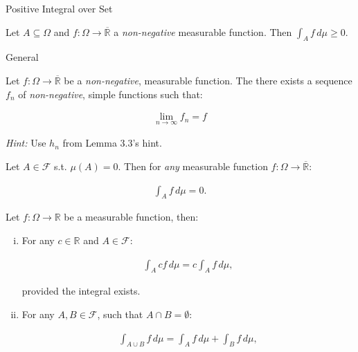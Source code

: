 \documentclass[10pt,landscape]{article}
\renewcommand{\geq}{\geqslant}
\newcommand{\Hint}{\textit{Hint: }}
\newcommand{\CalF}{\mathcal{F}}
\begin{document}
\begin{multicols}{3}
\begin{corollary}{}{Positive Integral over Set}

    Let $A \subseteq \Omega$ and $f: \Omega \to \overline{\mathbb{R}}$ a \emph{non-negative} measurable function. Then $\int_A f \, d\mu \geq 0$.

\end{corollary}

\begin{lemma}{3.3}{General}

    Let $f: \Omega \to \overline{\mathbb{R}}$ be a \emph{non-negative}, measurable function. The there exists a sequence $f_n$ of \emph{non-negative}, simple functions such that:

    \begin{align*}
        \lim_{n \to \infty} f_n = f
    \end{align*}

    \Hint Use $h_n$ from Lemma 3.3's hint.

\end{lemma}

\begin{exercise}{3.5}{}

    Let $A \in \CalF$ s.t. $\mu(A) = 0$. Then for \emph{any} measurable function $f: \Omega \to \overline{\mathbb{R}}$:
    
        \begin{align*}
            \int_A f \,d\mu = 0.
        \end{align*}

\end{exercise}

\begin{exercise}{3.6}{}

    Let $f: \Omega \to \mathbb{R}$ be a measurable function, then:

        \begin{enumerate}[(i)]
            \setlength{\parskip}{0em}
            \item For any $c \in \mathbb{R}$ and $A \in \CalF$:

                \begin{align*}
                    \int_A cf \, d\mu = c \int_A f \, d\mu,
                \end{align*}
            
            provided the integral exists.
            \item For any $A, B \in \CalF$, such that $A \cap B = \emptyset$:

                \begin{align*}
                    \int_{A \cup B} f \,d\mu = \int_{A} f \,d\mu + \int_{B} f \,d\mu,
                \end{align*}


\end{enumerate}
\end{exercise}
\end{multicols}
\end{document}
